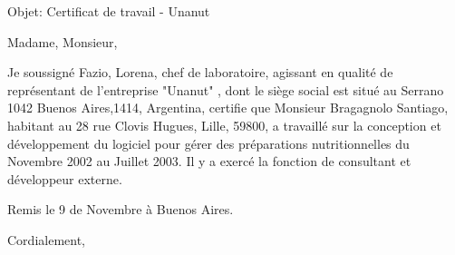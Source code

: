 \documentclass[11pt]{letter} %
\begin{document}

\begin{letter}{} 
\date{}%


\signature{Lorena Fazio - faziolorena@yahoo.com.ar} %


Objet: Certificat de travail - Unanut

\opening{Madame, Monsieur,} 

Je soussigné  Fazio, Lorena,  chef de laboratoire, agissant en qualité de représentant de  l'entreprise "Unanut"  , dont le siège social est situé au Serrano 1042 Buenos Aires,1414, Argentina,  certifie que Monsieur Bragagnolo Santiago, habitant au 28 rue Clovis Hugues, Lille, 59800, a travaillé sur la conception et développement du logiciel pour gérer des préparations nutritionnelles du Novembre 2002 au Juillet  2003. Il y a exercé la fonction de consultant et développeur externe. 
 

Remis le 9 de Novembre à Buenos Aires. 


\closing{Cordialement,}




\end{letter}
\end{document}

